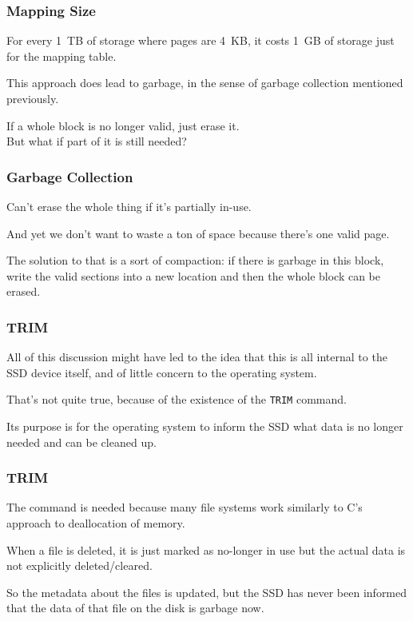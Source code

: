 \begin{frame}
\frametitle{Mapping Size}

For every 1~TB of storage where pages are 4~KB, it costs 1~GB of storage just for the mapping table.

This approach does lead to garbage, in the sense of garbage collection mentioned previously. 

If a whole block is no longer valid, just erase it.\\
\quad But what if part of it is still needed?

\end{frame}

\begin{frame}
\frametitle{Garbage Collection}

Can't erase the whole thing if it's partially in-use.

And yet we don't want to waste a ton of space because there's one valid page.


 The solution to that is a sort of compaction: if there is garbage in this block, write the valid sections into a new location and then the whole block can be erased.

\end{frame}

\begin{frame}
\frametitle{TRIM}

All of this discussion might have led to the idea that this is all internal to the SSD device itself, and of little concern to the operating system.

That's not quite true, because of the existence of the \texttt{TRIM} command. 

Its purpose is for the operating system to inform the SSD what data is no longer needed and can be cleaned up. 


\end{frame}


\begin{frame}
\frametitle{TRIM}

The command is needed because many file systems work similarly to C's approach to deallocation of memory.

When a file is deleted, it is just marked as no-longer in use but the actual data is not explicitly deleted/cleared. 

So the metadata about the files is updated, but the SSD has never been informed that the data of that file on the disk is garbage now.
\end{frame}


